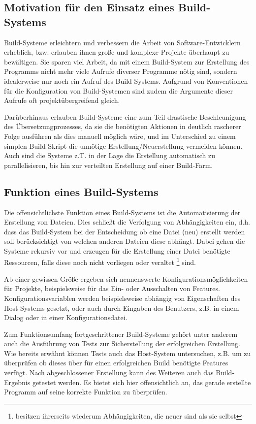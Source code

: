 \subsection{Motivation für den Einsatz eines Build-Systems} 

Build-Systeme erleichtern und verbessern die Arbeit von Software-Entwicklern
erheblich, bzw. erlauben ihnen große und komplexe Projekte überhaupt zu
bewältigen. Sie sparen viel Arbeit, da mit einem Build-System zur Erstellung des
Programms nicht mehr viele Aufrufe diverser Programme nötig sind, sondern
idealerweise nur noch ein Aufruf des Build-Systems.
%
Aufgrund von Konventionen für die Konfiguration von Build-Systemen sind zudem
die Argumente dieser Aufrufe oft projektübergreifend gleich.

Darüberhinaus erlauben Build-Systeme eine zum Teil drastische Beschleunigung des
Übersetzungprozesses, da sie die benötigten Aktionen in deutlich rascherer Folge
ausführen als dies manuell möglich wäre, und im Unterschied zu einem simplen
Build-Skript die unnötige Erstellung/Neuerstellung vermeiden können. Auch sind
die Systeme z.T. in der Lage die Erstellung automatisch zu parallelisieren, bis
hin zur verteilten Erstellung auf einer Build-Farm.

\subsection{Funktion eines Build-Systems}

Die offensichtlichste Funktion eines Build-Systems ist die Automatisierung der
Erstellung von Dateien. Dies schließt die Verfolgung von Abhängigkeiten ein,
d.h. dass das Build-System bei der Entscheidung ob eine Datei (neu) erstellt
werden soll berücksichtigt von welchen anderen Dateien diese abhängt.
%
Dabei gehen die Systeme rekursiv vor und erzeugen für die Erstellung einer Datei
benötigte Ressourcen, falls diese noch nicht vorliegen oder veraltet
\footnote{besitzen ihrerseits wiederum Abhängigkeiten, die neuer sind als sie
selbst} sind.

Ab einer gewissen Größe ergeben sich nennenswerte Konfigurationsmöglichkeiten
für Projekte, beispielsweise für das Ein- oder Ausschalten von Features.
Konfigurationsvariablen werden beispielsweise abhängig von Eigenschaften des
Host-Systems gesetzt, oder auch durch Eingaben des Benutzers, z.B. in einem
Dialog oder in einer Konfigurationsdatei.

%
Zum Funktionsumfang fortgeschrittener Build-Systeme gehört unter anderem auch
die Ausführung von Tests zur Sicherstellung der erfolgreichen Erstellung. Wie
bereits erwähnt können Tests auch das Host-System untersuchen, z.B. um zu
überprüfen ob dieses über für einen erfolgreichen Build benötigte Features
verfügt. Nach abgeschlossener Erstellung kann des Weiteren auch das
Build-Ergebnis getestet werden. Es bietet sich hier offensichtlich an, das
gerade erstellte Programm auf seine korrekte Funktion zu überprüfen.

